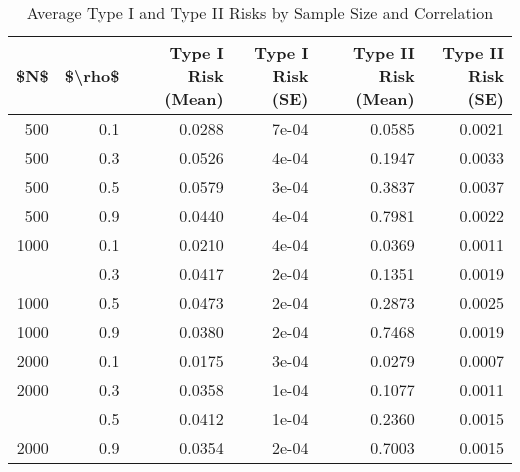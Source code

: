 \begin{table}

\caption{Average Type I and Type II Risks by Sample Size and Correlation}
\centering
\begin{tabular}[t]{rrrrrr}
\toprule
\$N\$ & \$\textbackslash{}rho\$ & Type I Risk (Mean) & Type I Risk (SE) & Type II Risk (Mean) & Type II Risk (SE)\\
\midrule
500 & 0.1 & 0.0288 & 7e-04 & 0.0585 & 0.0021\\
500 & 0.3 & 0.0526 & 4e-04 & 0.1947 & 0.0033\\
500 & 0.5 & 0.0579 & 3e-04 & 0.3837 & 0.0037\\
500 & 0.9 & 0.0440 & 4e-04 & 0.7981 & 0.0022\\
1000 & 0.1 & 0.0210 & 4e-04 & 0.0369 & 0.0011\\
\addlinespace
1000 & 0.3 & 0.0417 & 2e-04 & 0.1351 & 0.0019\\
1000 & 0.5 & 0.0473 & 2e-04 & 0.2873 & 0.0025\\
1000 & 0.9 & 0.0380 & 2e-04 & 0.7468 & 0.0019\\
2000 & 0.1 & 0.0175 & 3e-04 & 0.0279 & 0.0007\\
2000 & 0.3 & 0.0358 & 1e-04 & 0.1077 & 0.0011\\
\addlinespace
2000 & 0.5 & 0.0412 & 1e-04 & 0.2360 & 0.0015\\
2000 & 0.9 & 0.0354 & 2e-04 & 0.7003 & 0.0015\\
\bottomrule
\end{tabular}
\end{table}
